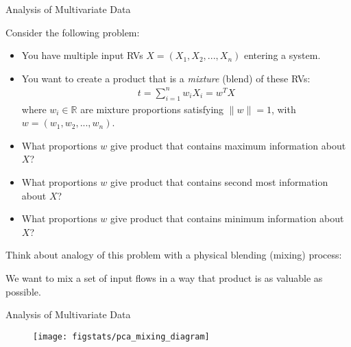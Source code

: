 \documentclass[handout,9pt]{beamer}
\begin{document}
%
\begin{frame}{Analysis of Multivariate Data}

Consider the following problem:
\begin{itemize}
\setlength{\itemsep}{10pt}
\item You have multiple input RVs $X=(X_1,X_2,...,X_n)$ entering a system.
 
\item You want to create a product that is a {\em mixture} (blend) of these RVs:
\begin{align*}
t=\sum_{i=1}^nw_iX_i=w^TX
\end{align*}
where $w_i\in \mathbb{R}$ are  mixture proportions satisfying $\|w\|=1$, with $w=(w_1, w_2,...,w_n)$. 

\item What proportions $w$ give product that contains maximum information about $X$?
\item What proportions $w$ give product that contains second most information about $X$?
\item What proportions $w$ give product that contains minimum information about $X$?

\end{itemize}
\vspace{0.1in}
Think about analogy of this problem with a physical blending (mixing) process: 
\begin{block}{}
We want to mix a set of input flows in a way that product is as valuable as possible.  
\end{block}

\end{frame}

%
\begin{frame}{Analysis of Multivariate Data}

\begin{figure}[!htb]
    \centering
	\texttt{[image: figstats/pca\_mixing\_diagram]}
\end{figure}

\end{frame}
\end{document}
